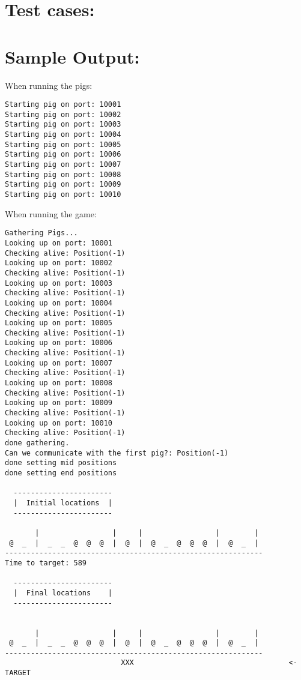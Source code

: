 \documentclass[]{article}
\makeatletter
\def\maxwidth{\ifdim\Gin@nat@width>\linewidth\linewidth
\else\Gin@nat@width\fi}
\let\Oldincludegraphics\includegraphics
\renewcommand{\includegraphics}[1]{\Oldincludegraphics[width=\maxwidth]{#1}}
\makeatother
\begin{document}
\pagebreak

\section{Test cases:}


\section{Sample Output:}

When running the pigs:

\begin{verbatim}
Starting pig on port: 10001
Starting pig on port: 10002
Starting pig on port: 10003
Starting pig on port: 10004
Starting pig on port: 10005
Starting pig on port: 10006
Starting pig on port: 10007
Starting pig on port: 10008
Starting pig on port: 10009
Starting pig on port: 10010
\end{verbatim}

When running the game:

\begin{verbatim}
Gathering Pigs...
Looking up on port: 10001
Checking alive: Position(-1)
Looking up on port: 10002
Checking alive: Position(-1)
Looking up on port: 10003
Checking alive: Position(-1)
Looking up on port: 10004
Checking alive: Position(-1)
Looking up on port: 10005
Checking alive: Position(-1)
Looking up on port: 10006
Checking alive: Position(-1)
Looking up on port: 10007
Checking alive: Position(-1)
Looking up on port: 10008
Checking alive: Position(-1)
Looking up on port: 10009
Checking alive: Position(-1)
Looking up on port: 10010
Checking alive: Position(-1)
done gathering.
Can we communicate with the first pig?: Position(-1)
done setting mid positions
done setting end positions

  -----------------------
  |  Initial locations  |
  -----------------------

       |                 |     |                 |        | 
 @  _  |  _  _  @  @  @  |  @  |  @  _  @  @  @  |  @  _  | 
------------------------------------------------------------
Time to target: 589

  -----------------------
  |  Final locations    |
  -----------------------


       |                 |     |                 |        | 
 @  _  |  _  _  @  @  @  |  @  |  @  _  @  @  @  |  @  _  | 
------------------------------------------------------------
                           XXX                                    <- TARGET
\end{verbatim}
\end{document}
